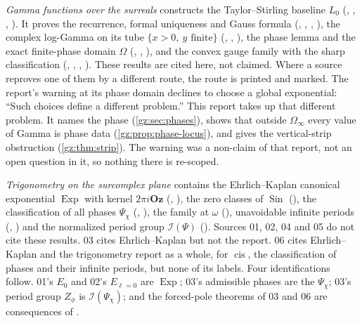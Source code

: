 \documentclass[11pt,a4paper]{article}
\numberwithin{equation}{section}
\theoremstyle{definition}
\theoremstyle{remark}
\newcommand{\Oz}{\mathbf{Oz}}
\newcommand{\cis}{\operatorname{cis}}
\newcommand{\Exp}{\operatorname{Exp}}
\newcommand{\Sin}{\operatorname{Sin}}
\newcommand{\cI}{\mathcal I}
\newcommand{\Om}{\Omega_{\infty}}
\begin{document}
\emph{Gamma functions over the surreals} \cite{RGamma} constructs the
Taylor--Stirling baseline $L_0$ (, ,
, ). It proves the recurrence, formal
uniqueness and Gauss formula (,
, , ), the
complex log-Gamma on its tube $\{x>0,\ y\text{ finite}\}$
(, ,
), the phase lemma and the exact finite-phase
domain $\Omega$ (, ,
), and the convex gauge family with the sharp
classification (, , ,
). These results are cited here, not claimed. Where a
source reproves one of them by a different route, the route is printed and
marked. The report's warning at its phase domain declines to choose a
global exponential: ``Such choices define a different problem.'' This
report takes up that different problem. It names the phase
(\cref{gz:sec:phases}), shows that outside $\Om$ every value of Gamma is
phase data (\cref{gz:prop:phase-locus}), and gives the vertical-strip
obstruction (\cref{gz:thm:strip}). The warning was a non-claim of that
report, not an open question in it, so nothing there is re-scoped.

\emph{Trigonometry on the surcomplex plane} \cite{RTrig} contains the
Ehrlich--Kaplan canonical exponential $\Exp$ with kernel $2\pi i\Oz$
(, ), the
zero classes of $\Sin$ (), the
classification of all phases $\Psi_\chi$ (,
), the family at $\omega$
(), unavoidable infinite periods
(, )
and the normalized period group $\cI(\Psi)$
(). Sources 01, 02, 04 and 05 do not
cite these results. 03 cites Ehrlich--Kaplan but not the report. 06 cites
Ehrlich--Kaplan and the trigonometry report as a whole, for $\cis$, the
classification of phases and their infinite periods, but none of its labels.
Four identifications follow. 01's $E_0$ and 02's $E_{\ell=0}$ are $\Exp$;
03's admissible phases are the $\Psi_\chi$; 03's period group $Z_\phi$ is
$\cI(\Psi_\chi)$; and the forced-pole theorems of 03 and 06 are
consequences of .
\end{document}
